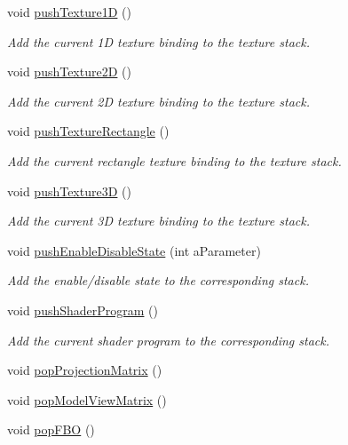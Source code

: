 \begin{DoxyCompactItemize}
void \hyperlink{namespace_utilities_acc7a477a449c637b37acf6e409ffda9a}{pushTexture1D} ()
\begin{DoxyCompactList}\small\item\em Add the current 1D texture binding to the texture stack. \end{DoxyCompactList}\item 
void \hyperlink{namespace_utilities_ac3f7c9af73fc18c8e905ec33e423e62a}{pushTexture2D} ()
\begin{DoxyCompactList}\small\item\em Add the current 2D texture binding to the texture stack. \end{DoxyCompactList}\item 
void \hyperlink{namespace_utilities_ade797d2da463a1e1774e46fb1519a3a6}{pushTextureRectangle} ()
\begin{DoxyCompactList}\small\item\em Add the current rectangle texture binding to the texture stack. \end{DoxyCompactList}\item 
void \hyperlink{namespace_utilities_a6c5b0b068baed228d72a5ab5bc171a27}{pushTexture3D} ()
\begin{DoxyCompactList}\small\item\em Add the current 3D texture binding to the texture stack. \end{DoxyCompactList}\item 
void \hyperlink{namespace_utilities_a397b32b08d50b0f86540e20ec9d9a8a6}{pushEnableDisableState} (int aParameter)
\begin{DoxyCompactList}\small\item\em Add the enable/disable state to the corresponding stack. \end{DoxyCompactList}\item 
void \hyperlink{namespace_utilities_af3def433e5459d13617b1f3ac1f80bd4}{pushShaderProgram} ()
\begin{DoxyCompactList}\small\item\em Add the current shader program to the corresponding stack. \end{DoxyCompactList}\item 
void \hyperlink{namespace_utilities_a34e5aecb15bd70f3d358b1df30ad2b1e}{popProjectionMatrix} ()
\item 
void \hyperlink{namespace_utilities_afa855d36de0ce9d6d52e2157da5063b9}{popModelViewMatrix} ()
\item 
void \hyperlink{namespace_utilities_a155eb0147d0e117e1d34467ce4bf8495}{popFBO} ()

\end{DoxyCompactItemize}
